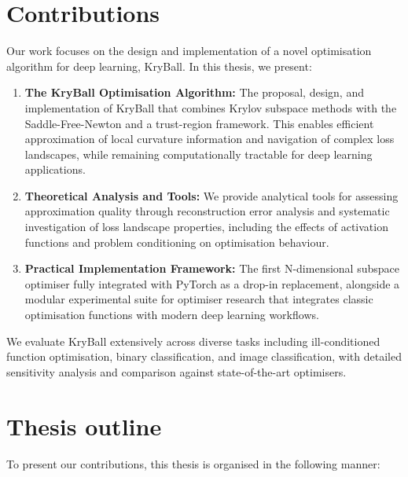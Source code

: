 \section{Contributions}
\label{sec:contributions}

Our work focuses on the design and implementation of a novel optimisation algorithm for deep learning, KryBall. In this thesis, we present:
\begin{enumerate}
   \item \textbf{The KryBall Optimisation Algorithm:} The proposal, design, and implementation of KryBall that combines Krylov subspace methods with the Saddle-Free-Newton and a trust-region framework. This enables efficient approximation of local curvature information and navigation of complex loss landscapes, while remaining computationally tractable for deep learning applications.
   \item \textbf{Theoretical Analysis and Tools:} We provide analytical tools for assessing approximation quality through reconstruction error analysis and systematic investigation of loss landscape properties, including the effects of activation functions and problem conditioning on optimisation behaviour.
   \item \textbf{Practical Implementation Framework:} The first N-dimensional subspace optimiser fully integrated with PyTorch as a drop-in replacement, alongside a modular experimental suite for optimiser research that integrates classic optimisation functions with modern deep learning workflows.
\end{enumerate}

We evaluate KryBall extensively across diverse tasks including ill-conditioned function optimisation, binary classification, and image classification, with detailed sensitivity analysis and comparison against state-of-the-art optimisers.

\section{Thesis outline}
\label{sec:thesis_outline}

To present our contributions, this thesis is organised in the following manner:

